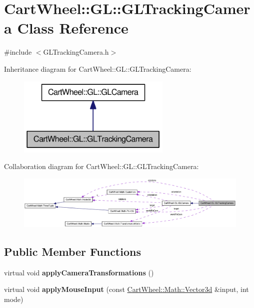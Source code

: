 \hypertarget{classCartWheel_1_1GL_1_1GLTrackingCamera}{
\section{CartWheel::GL::GLTrackingCamera Class Reference}
\label{classCartWheel_1_1GL_1_1GLTrackingCamera}
}


{\ttfamily \#include $<$GLTrackingCamera.h$>$}



Inheritance diagram for CartWheel::GL::GLTrackingCamera:\nopagebreak
\begin{figure}[H]
\begin{center}
\leavevmode
\includegraphics[width=208pt]{classCartWheel_1_1GL_1_1GLTrackingCamera__inherit__graph}
\end{center}
\end{figure}


Collaboration diagram for CartWheel::GL::GLTrackingCamera:\nopagebreak
\begin{figure}[H]
\begin{center}
\leavevmode
\includegraphics[width=400pt]{classCartWheel_1_1GL_1_1GLTrackingCamera__coll__graph}
\end{center}
\end{figure}
\subsection*{Public Member Functions}
\begin{DoxyCompactItemize}
\item 
\hypertarget{classCartWheel_1_1GL_1_1GLTrackingCamera_ab3490447e18e87e262cf7a01aa74224b}{
virtual void {\bfseries applyCameraTransformations} ()}
\label{classCartWheel_1_1GL_1_1GLTrackingCamera_ab3490447e18e87e262cf7a01aa74224b}

\item 
\hypertarget{classCartWheel_1_1GL_1_1GLTrackingCamera_a058285eeef3f588f45793193ba25bcc3}{
virtual void {\bfseries applyMouseInput} (const \hyperlink{classCartWheel_1_1Math_1_1Vector3d}{CartWheel::Math::Vector3d} \&input, int mode)}
\label{classCartWheel_1_1GL_1_1GLTrackingCamera_a058285eeef3f588f45793193ba25bcc3}

\end{DoxyCompactItemize}
